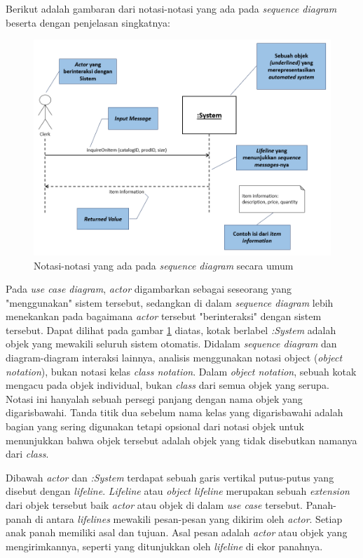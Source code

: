 \documentclass[a4paper]{article}
\begin{document}
\begin{enumerate}
    Berikut adalah gambaran dari notasi-notasi yang ada pada \textit{sequence diagram} beserta dengan penjelasan singkatnya: 

    \begin{figure}[h]
        \centering
        \includegraphics[scale=0.5]{images/uml satzinger/sequence diagram/notasi sequence diagram.png}
        \caption{Notasi-notasi yang ada pada \textit{sequence diagram} secara umum}
        \label{fig:notasisequence}
    \end{figure}

    Pada \textit{use case diagram}, \textit{actor} digambarkan sebagai seseorang yang "menggunakan" sistem tersebut, sedangkan di dalam \textit{sequence diagram} lebih menekankan pada bagaimana \textit{actor} tersebut "berinteraksi" dengan sistem tersebut. Dapat dilihat pada gambar \ref{fig:notasisequence} diatas, kotak berlabel \textit{:System} adalah objek yang mewakili seluruh sistem otomatis. Didalam \textit{sequence diagram} dan diagram-diagram interaksi lainnya, analisis menggunakan notasi object (\textit{object notation}), bukan notasi kelas \textit{class notation}. Dalam \textit{object notation}, sebuah kotak mengacu pada objek individual, bukan \textit{class} dari semua objek yang serupa. Notasi ini hanyalah sebuah persegi panjang dengan nama objek yang digarisbawahi. Tanda titik dua sebelum nama kelas yang digarisbawahi adalah bagian yang sering digunakan tetapi opsional dari notasi objek untuk menunjukkan bahwa objek tersebut adalah objek yang tidak disebutkan namanya dari \textit{class}\autocite[139-146]{uml-satzinger}.

    Dibawah \textit{actor} dan \textit{:System} terdapat sebuah garis vertikal putus-putus yang disebut dengan \textit{lifeline}. \textit{Lifeline} atau \textit{object lifeline} merupakan sebuah \textit{extension} dari objek tersebut baik \textit{actor} atau objek di dalam \textit{use case} tersebut. Panah-panah di antara \textit{lifelines} mewakili pesan-pesan yang dikirim oleh \textit{actor}. Setiap anak panah memiliki asal dan tujuan. Asal pesan adalah \textit{actor} atau objek yang mengirimkannya, seperti yang ditunjukkan oleh \textit{lifeline} di ekor panahnya\autocite[139-146]{uml-satzinger}. 
    

\end{enumerate}
\end{document}
